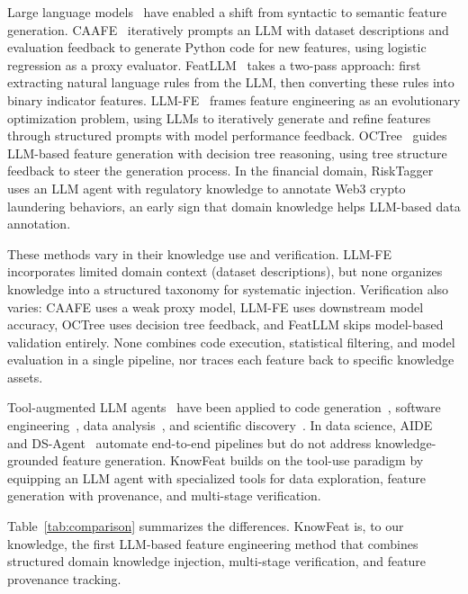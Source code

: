 Large language models~\cite{brown2020gpt3,touvron2023llama} have enabled a shift from syntactic to semantic feature generation. CAAFE~\cite{hollmann2023caafe} iteratively prompts an LLM with dataset descriptions and evaluation feedback to generate Python code for new features, using logistic regression as a proxy evaluator. FeatLLM~\cite{han2024featllm} takes a two-pass approach: first extracting natural language rules from the LLM, then converting these rules into binary indicator features. LLM-FE~\cite{abhyankar2025llmfe} frames feature engineering as an evolutionary optimization problem, using LLMs to iteratively generate and refine features through structured prompts with model performance feedback. OCTree~\cite{nam2024octree} guides LLM-based feature generation with decision tree reasoning, using tree structure feedback to steer the generation process. In the financial domain, RiskTagger~\cite{li2025risktagger} uses an LLM agent with regulatory knowledge to annotate Web3 crypto laundering behaviors, an early sign that domain knowledge helps LLM-based data annotation.

These methods vary in their knowledge use and verification. LLM-FE incorporates limited domain context (dataset descriptions), but none organizes knowledge into a structured taxonomy for systematic injection. Verification also varies: CAAFE uses a weak proxy model, LLM-FE uses downstream model accuracy, OCTree uses decision tree feedback, and FeatLLM skips model-based validation entirely. None combines code execution, statistical filtering, and model evaluation in a single pipeline, nor traces each feature back to specific knowledge assets.

Tool-augmented LLM agents~\cite{yao2023react} have been applied to code generation~\cite{qian2024chatdev}, software engineering~\cite{jimenez2024swe}, data analysis~\cite{hong2024data}, and scientific discovery~\cite{boiko2023autonomous}. In data science, AIDE~\cite{jiang2025aide} and DS-Agent~\cite{guo2024ds} automate end-to-end pipelines but do not address knowledge-grounded feature generation. KnowFeat builds on the tool-use paradigm by equipping an LLM agent with specialized tools for data exploration, feature generation with provenance, and multi-stage verification.

Table~\ref{tab:comparison} summarizes the differences. KnowFeat is, to our knowledge, the first LLM-based feature engineering method that combines structured domain knowledge injection, multi-stage verification, and feature provenance tracking.

